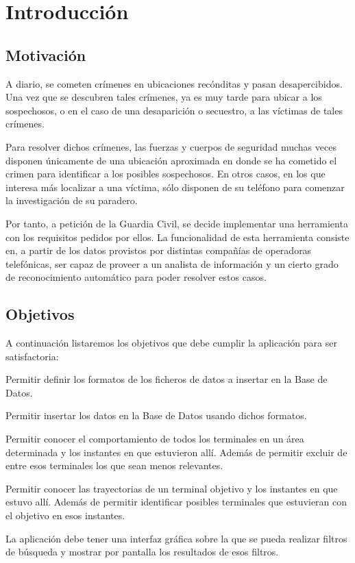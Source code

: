 \chapter{Introducción\label{CAP:INTRODUCCION}}
  
  \section{Motivación\label{SEC:MOTIVACION}}
    A diario, se cometen crímenes en ubicaciones recónditas y pasan desapercibidos. Una vez que se descubren tales crímenes, ya es muy tarde para ubicar a los sospechosos, o en el caso de una desaparición o secuestro, a las víctimas de tales crímenes.
    
    Para resolver dichos crímenes, las fuerzas y cuerpos de seguridad muchas veces disponen únicamente de una ubicación aproximada en donde se ha cometido el crimen para identificar a los posibles sospechosos. En otros casos, en los que interesa más localizar a una víctima, sólo disponen de su teléfono para comenzar la investigación de su paradero.
    
    Por tanto, a petición de la Guardia Civil, se decide implementar una herramienta con los requisitos pedidos por ellos.
    La funcionalidad de esta herramienta consiste en, a partir de los datos provistos por distintas compañías de operadoras telefónicas, ser capaz de proveer a un analista de información y un cierto grado de reconocimiento automático para poder resolver estos casos.
  
  
  \section{Objetivos\label{SEC:OBJETIVOS}}
    A continuación listaremos los objetivos que debe cumplir la aplicación para ser satisfactoria:
    \begin{objetive}
      \item Permitir definir los formatos de los ficheros de datos a insertar en la Base de Datos.
      \item Permitir insertar los datos en la Base de Datos usando dichos formatos.
      
      \item Permitir conocer el comportamiento de todos los terminales en un área determinada y los instantes en que estuvieron allí. Además de permitir excluir de entre esos terminales los que sean menos relevantes.
      
      \item Permitir conocer las trayectorias de un terminal objetivo y los instantes en que estuvo allí. Además de permitir identificar posibles terminales que estuvieran con el objetivo en esos instantes.

      \item La aplicación debe tener una interfaz gráfica sobre la que se pueda realizar filtros de búsqueda y mostrar por pantalla los resultados de esos filtros.
    \end{objetive}
  
